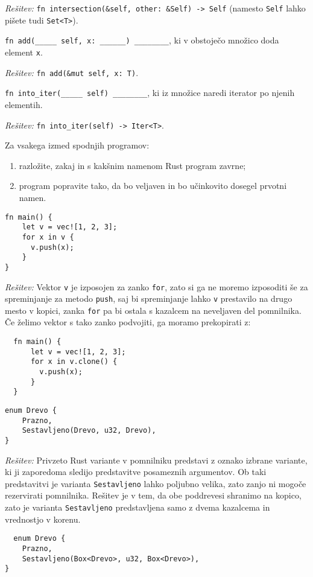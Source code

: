 \documentclass[arhiv]{../izpit}
\begin{document}
\noindent
\emph{Rešitev:} \texttt{fn intersection(&self, other: &Self) -> Self} (namesto \texttt{Self} lahko pišete tudi \texttt{Set<T>}).

\podnaloga
\texttt{fn add(_____ self, x: ______) ________}, ki v obstoječo množico doda element \texttt{x}.

\noindent
\emph{Rešitev:} \texttt{fn add(&mut self, x: T)}.

\podnaloga
\texttt{fn into_iter(_____ self) ________}, ki iz množice naredi iterator po njenih elementih.

\noindent
\emph{Rešitev:} \texttt{fn into_iter(self) -> Iter<T>}.



\naloga[\tocke{30}]

Za vsakega izmed spodnjih programov:
\begin{enumerate}
  \item razložite, zakaj in s kakšnim namenom Rust program zavrne;
  \item program popravite tako, da bo veljaven in bo učinkovito dosegel prvotni namen.
\end{enumerate}

\podnaloga
\begin{verbatim}
fn main() {
    let v = vec![1, 2, 3];
    for x in v {
      v.push(x);
    }
}
\end{verbatim}

\noindent
\emph{Rešitev:} Vektor \texttt{v} je izposojen za zanko \texttt{for}, zato si ga ne moremo izposoditi še za spreminjanje za metodo \texttt{push}, saj bi spreminjanje lahko \texttt{v} prestavilo na drugo mesto v kopici, zanka \texttt{for} pa bi ostala s kazalcem na neveljaven del pomnilnika. Če želimo vektor s tako zanko podvojiti, ga moramo prekopirati z:
%
\begin{verbatim}
  fn main() {
      let v = vec![1, 2, 3];
      for x in v.clone() {
        v.push(x);
      }
  }
\end{verbatim}

\podnaloga
\begin{verbatim}
enum Drevo {
    Prazno,
    Sestavljeno(Drevo, u32, Drevo),
}
\end{verbatim}

\noindent
\emph{Rešitev:} Privzeto Rust variante v pomnilniku predstavi z oznako izbrane variante, ki ji zaporedoma sledijo predstavitve posameznih argumentov. Ob taki predstavitvi je varianta \texttt{Sestavljeno} lahko poljubno velika, zato zanjo ni mogoče rezervirati pomnilnika. Rešitev je v tem, da obe poddrevesi shranimo na kopico, zato je varianta \texttt{Sestavljeno} predstavljena samo z dvema kazalcema in vrednostjo v korenu.
%
\begin{verbatim}
  enum Drevo {
    Prazno,
    Sestavljeno(Box<Drevo>, u32, Box<Drevo>),
}
\end{verbatim}
\end{document}
